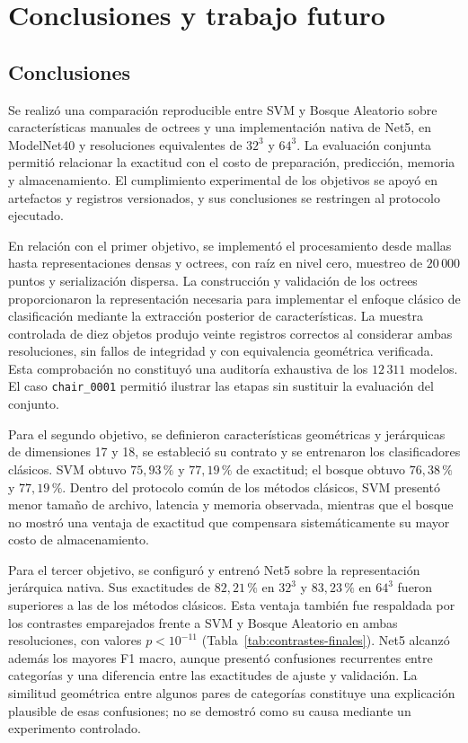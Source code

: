 \chapter{Conclusiones y trabajo futuro}
\label{chap:conclusiones}
\section{Conclusiones}
Se realizó una comparación reproducible entre SVM y Bosque Aleatorio sobre características manuales de octrees y una implementación nativa de Net5, en ModelNet40 y resoluciones equivalentes de $32^3$ y $64^3$. La evaluación conjunta permitió relacionar la exactitud con el costo de preparación, predicción, memoria y almacenamiento. El cumplimiento experimental de los objetivos se apoyó en artefactos y registros versionados, y sus conclusiones se restringen al protocolo ejecutado.

En relación con el primer objetivo, se implementó el procesamiento desde mallas hasta representaciones densas y octrees, con raíz en nivel cero, muestreo de $20\,000$ puntos y serialización dispersa. La construcción y validación de los octrees proporcionaron la representación necesaria para implementar el enfoque clásico de clasificación mediante la extracción posterior de características. La muestra controlada de diez objetos produjo veinte registros correctos al considerar ambas resoluciones, sin fallos de integridad y con equivalencia geométrica verificada. Esta comprobación no constituyó una auditoría exhaustiva de los $12\,311$ modelos. El caso \texttt{chair\_0001} permitió ilustrar las etapas sin sustituir la evaluación del conjunto.

Para el segundo objetivo, se definieron características geométricas y jerárquicas de dimensiones 17 y 18, se estableció su contrato y se entrenaron los clasificadores clásicos. SVM obtuvo $75{,}93\,\%$ y $77{,}19\,\%$ de exactitud; el bosque obtuvo $76{,}38\,\%$ y $77{,}19\,\%$. Dentro del protocolo común de los métodos clásicos, SVM presentó menor tamaño de archivo, latencia y memoria observada, mientras que el bosque no mostró una ventaja de exactitud que compensara sistemáticamente su mayor costo de almacenamiento.

Para el tercer objetivo, se configuró y entrenó Net5 sobre la representación jerárquica nativa. Sus exactitudes de $82{,}21\,\%$ en $32^3$ y $83{,}23\,\%$ en $64^3$ fueron superiores a las de los métodos clásicos. Esta ventaja también fue respaldada por los contrastes emparejados frente a SVM y Bosque Aleatorio en ambas resoluciones, con valores $p<10^{-11}$ (Tabla~\ref{tab:contrastes-finales}). Net5 alcanzó además los mayores F1 macro, aunque presentó confusiones recurrentes entre categorías y una diferencia entre las exactitudes de ajuste y validación. La similitud geométrica entre algunos pares de categorías constituye una explicación plausible de esas confusiones; no se demostró como su causa mediante un experimento controlado.

